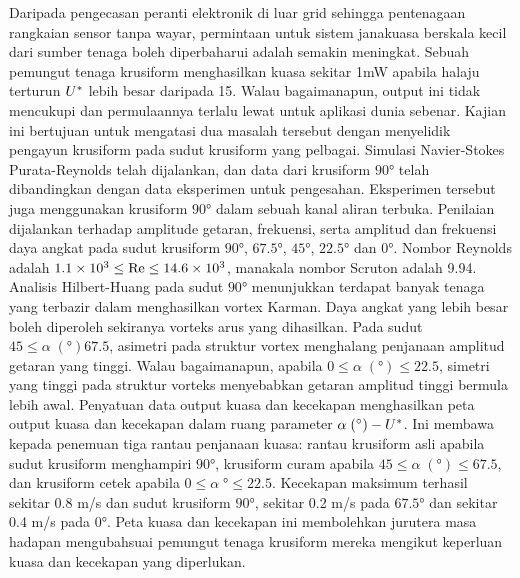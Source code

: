 \documentclass[oneside]{utmthesis}
\begin{document}
\begin{abstrak}
  Daripada pengecasan peranti elektronik di luar grid sehingga pentenagaan rangkaian sensor tanpa wayar, permintaan untuk sistem janakuasa berskala kecil dari sumber tenaga boleh diperbaharui adalah semakin meningkat. Sebuah pemungut tenaga krusiform menghasilkan kuasa sekitar 1mW apabila halaju terturun $U^{*}$ lebih besar daripada 15. Walau bagaimanapun, output ini tidak mencukupi dan permulaannya terlalu lewat untuk aplikasi dunia sebenar. Kajian ini bertujuan untuk mengatasi dua masalah tersebut dengan menyelidik pengayun krusiform pada sudut krusiform yang pelbagai. Simulasi Navier-Stokes Purata-Reynolds telah dijalankan, dan data dari krusiform $90 \si{\degree}$ telah dibandingkan dengan data eksperimen untuk pengesahan. Eksperimen tersebut juga menggunakan krusiform $90 \si{\degree}$ dalam sebuah kanal aliran terbuka. Penilaian dijalankan terhadap amplitude getaran, frekuensi, serta amplitud dan frekuensi daya angkat pada sudut krusiform $90 \si{\degree}$, $67.5 \si{\degree}$, $45 \si{\degree}$, $22.5 \si{\degree}$ dan $0 \si{\degree}$. Nombor Reynolds adalah $1.1 \times 10^{3} \leq \text{Re} \leq 14.6 \times 10^{3}$, manakala nombor Scruton adalah 9.94. Analisis Hilbert-Huang pada sudut $90 \si{\degree}$ menunjukkan terdapat banyak tenaga yang terbazir dalam menghasilkan vortex Karman. Daya angkat yang lebih besar boleh diperoleh sekiranya vorteks arus yang dihasilkan. Pada sudut $45 \leq \alpha \; (\si{\degree}) 67.5$, asimetri pada struktur vortex menghalang penjanaan amplitud getaran yang tinggi. Walau bagaimanapun, apabila $0 \leq \alpha \; (\si{\degree}) \leq 22.5$, simetri yang tinggi pada struktur vorteks menyebabkan getaran amplitud tinggi bermula lebih awal. Penyatuan data output kuasa dan kecekapan menghasilkan peta output kuasa dan kecekapan dalam ruang parameter $\alpha \; (\si{\degree})-\ured$. Ini membawa kepada penemuan tiga rantau penjanaan kuasa: rantau krusiform asli apabila sudut krusiform menghampiri $90 \si{\degree}$, krusiform curam apabila $45 \leq \alpha \; (\si{\degree}) \leq 67.5$, dan krusiform cetek apabila $0 \leq \alpha \; \si{\degree} \leq 22.5$. Kecekapan maksimum terhasil sekitar 0.8 m/s dan sudut krusiform $90 \si{\degree}$, sekitar 0.2 m/s pada $67.5 \si{\degree}$ dan sekitar 0.4 m/s pada $0 \si{\degree}$. Peta kuasa dan kecekapan ini membolehkan jurutera masa hadapan mengubahsuai pemungut tenaga krusiform mereka mengikut keperluan kuasa dan kecekapan yang diperlukan.


\end{abstrak}
\end{document}
